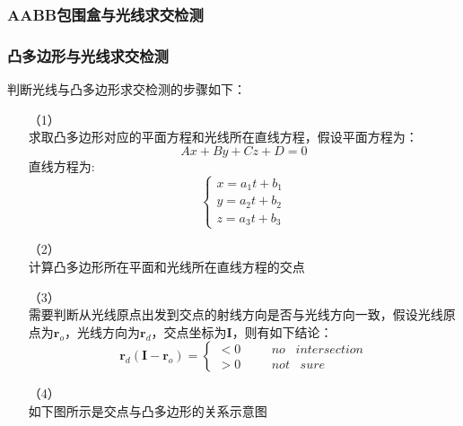 \documentclass[10pt]{article}
\begin{document}
\subsubsection{AABB包围盒与光线求交检测}

\subsubsection{凸多边形与光线求交检测}
判断光线与凸多边形求交检测的步骤如下：
\begin{itemize}
\item[（1）]{} \mbox{} \\
求取凸多边形对应的平面方程和光线所在直线方程，假设平面方程为：
$$Ax+By+Cz+D=0$$
直线方程为:
$$
\left\{
\begin{array}{rl}
x=a_1t+b_1\\
y=a_2t+b_2\\
z=a_3t+b_3
\end{array}
\right.
$$
\item[（2）]{} \mbox{} \\
计算凸多边形所在平面和光线所在直线方程的交点
\item[（3）]{} \mbox{} \\
需要判断从光线原点出发到交点的射线方向是否与光线方向一致，假设光线原点为$\bm{r}_o$，光线方向为$\bm{r}_d$，交点坐标为$\bm{I}$，则有如下结论：
$$
\bm{r}_d(\bm{I}-\bm{r}_o)=
\left\{
\begin{array}{rl}
<0 & \hspace{20pt} no \hspace{10pt} intersection \\
>0 & \hspace{20pt} not \hspace{10pt} sure
\end{array}
\right.
$$
\item[（4）]{}  \mbox{} \\
如下图所示是交点与凸多边形的关系示意图
\begin{figure}[H]
\begin{center}

\end{center}
\end{figure}
\end{itemize}
\end{document}
